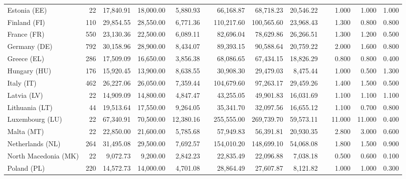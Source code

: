 \documentclass[a4paper,11pt,oneside]{article}
\begin{document}
\begin{table}
{\begin{tabular}{lrrrrrrrrrrrr}
Estonia (EE)         & 22      & 17,840.91  & 18,000.00  & 5,880.93   &  & 66,168.87   & 68,718.23   & 20,546.22  &  & 1.000  & 1.000  & 1.000  \\
Finland (FI)         & 110     & 29,854.55  & 28,550.00  & 6,771.36   &  & 110,217.60  & 100,565.60  & 23,968.43  &  & 1.300  & 0.800  & 0.800  \\
France (FR)          & 550     & 23,130.36  & 22,500.00  & 6,089.11   &  & 82,696.04   & 78,629.86   & 26,266.51  &  & 1.300  & 1.200  & 0.500  \\
Germany (DE)         & 792     & 30,158.96  & 28,900.00  & 8,434.07   &  & 89,393.15   & 90,588.64   & 20,759.22  &  & 2.000  & 1.600  & 0.800  \\
Greece (EL)          & 286     & 17,509.09  & 16,650.00  & 3,856.38   &  & 68,086.65   & 67,434.15   & 18,826.29  &  & 0.800  & 0.800  & 0.400  \\
Hungary (HU)         & 176     & 15,920.45  & 13,900.00  & 8,638.55   &  & 30,908.30   & 29,479.03   & 8,475.44   &  & 1.000  & 0.500  & 1.300  \\
Italy (IT)           & 462     & 26,227.06  & 26,050.00  & 7,359.44   &  & 104,679.60  & 97,263.17   & 29,459.26  &  & 1.400  & 1.500  & 0.500  \\
Latvia (LV)          & 22      & 14,909.09  & 14,800.00  & 4,847.47   &  & 43,255.05   & 49,901.83   & 16,031.69  &  & 1.100  & 1.100  & 1.100  \\
Lithuania (LT)       & 44      & 19,513.64  & 17,550.00  & 9,264.05   &  & 35,341.70   & 32,097.56   & 16,655.12  &  & 1.100  & 0.700  & 0.800  \\
Luxembourg (LU)      & 22      & 67,340.91  & 70,500.00  & 12,380.16  &  & 255,555.00  & 269,739.70  & 59,573.11  &  & 11.000 & 11.000 & 0.400  \\
Malta (MT)           & 22      & 22,850.00  & 21,600.00  & 5,785.68   &  & 57,949.83   & 56,391.81   & 20,930.35  &  & 2.800  & 3.000  & 0.600  \\
Netherlands (NL)     & 264     & 31,495.08  & 29,500.00  & 7,692.57   &  & 154,010.20  & 148,699.10  & 54,068.08  &  & 1.800  & 1.500  & 0.900  \\
North Macedonia (MK) & 22      & 9,072.73   & 9,200.00   & 2,842.23   &  & 22,835.49   & 22,096.88   & 7,038.18   &  & 0.500  & 0.600  & 0.100  \\
Poland (PL)          & 220     & 14,572.73  & 14,000.00  & 4,701.08   &  & 28,864.49   & 27,607.87   & 8,121.82   &  & 1.000  & 1.000  & 0.300  \\

\end{tabular}}
\end{table}
\end{document}
